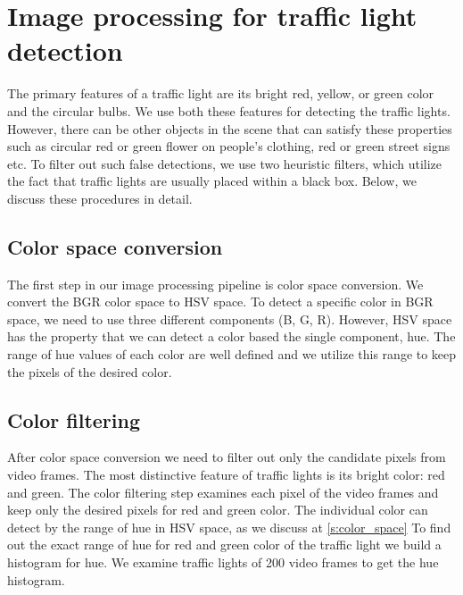 \section{Image processing for traffic light detection}
The primary features of a traffic light are its bright red, yellow, or green color and the circular bulbs.
We use both these features for detecting the traffic lights. 
However, there can be other objects in the scene that can satisfy these properties such as circular red or green flower on people's clothing, red or green street signs etc.
To filter out such false detections, we use two heuristic filters, which utilize the fact that traffic lights are usually placed within a black box. 
Below, we discuss these procedures in detail.



\subsection{Color space conversion}
The first step in our image processing pipeline is color space conversion.
We convert the BGR color space to HSV space.
To detect a specific color in BGR space, we need to use three different components (B, G, R).
However, HSV space has the property that we can detect a color based the single component, hue.
The range of hue values of each color are well defined and we utilize this range to keep the pixels of the desired color.


\subsection{Color filtering}

After color space conversion we need to filter out only the candidate pixels from video frames.
The most distinctive feature of traffic lights is its bright color: red and green.
The color filtering step examines each pixel of the video frames and keep only the desired pixels for red and green color.
The individual color can detect by the range of hue in HSV space, as we discuss at \ref{s:color_space}
To find out the exact range of hue for red and green color of the traffic light we build a histogram for hue.
We examine traffic lights of 200 video frames to get the hue histogram.


